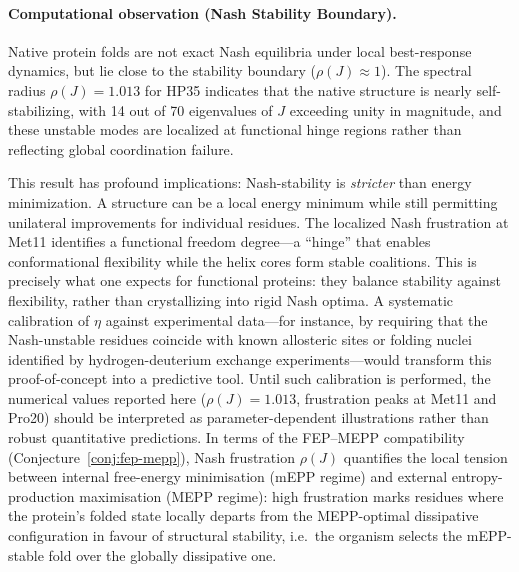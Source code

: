 \documentclass[12pt,a4paper]{article}
\theoremstyle{remark}
\begin{document}
\paragraph{Computational observation (Nash Stability Boundary).}
Native protein folds are not exact Nash equilibria under local best-response dynamics, but lie close to the stability boundary ($\rho(J) \approx 1$). The spectral radius $\rho(J) = 1.013$ for HP35 indicates that the native structure is nearly self-stabilizing, with 14 out of 70 eigenvalues of $J$ exceeding unity in magnitude, and these unstable modes are localized at functional hinge regions rather than reflecting global coordination failure.

This result has profound implications: Nash-stability is \textit{stricter} than energy minimization. A structure can be a local energy minimum while still permitting unilateral improvements for individual residues. The localized Nash frustration at Met11 identifies a functional freedom degree---a ``hinge'' that enables conformational flexibility while the helix cores form stable coalitions. This is precisely what one expects for functional proteins: they balance stability against flexibility, rather than crystallizing into rigid Nash optima. A systematic calibration of $\eta$ against experimental data---for instance, by requiring that the Nash-unstable residues coincide with known allosteric sites or folding nuclei identified by hydrogen-deuterium exchange experiments---would transform this proof-of-concept into a predictive tool. Until such calibration is performed, the numerical values reported here ($\rho(J) = 1.013$, frustration peaks at Met11 and Pro20) should be interpreted as parameter-dependent illustrations rather than robust quantitative predictions.
In terms of the FEP--MEPP compatibility (Conjecture~\ref{conj:fep-mepp}), Nash frustration $\rho(J)$ quantifies the local tension between internal free-energy minimisation (mEPP regime) and external entropy-production maximisation (MEPP regime): high frustration marks residues where the protein's folded state locally departs from the MEPP-optimal dissipative configuration in favour of structural stability, i.e.\ the organism selects the mEPP-stable fold over the globally dissipative one.
\end{document}
